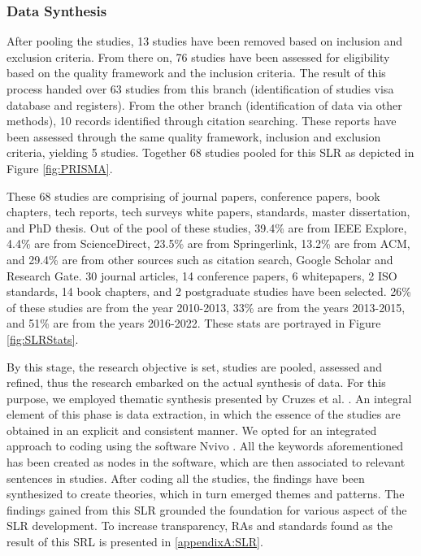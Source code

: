 \documentclass[review]{elsarticle}
\begin{document}
\subsubsection{Data Synthesis}

After pooling the studies, 13 studies have been removed based on inclusion  and exclusion criteria. From there on, 76 studies have been assessed for eligibility based on the quality framework and the inclusion criteria. The result of this process handed over 63 studies from this branch (identification of studies visa database and registers). From the other branch (identification of data via other methods), 10 records identified through citation searching. These reports have been assessed through the same quality framework, inclusion and exclusion criteria, yielding 5 studies. Together 68 studies pooled for this SLR as depicted in Figure \ref{fig:PRISMA}.


These 68 studies are comprising of journal papers, conference papers, book chapters, tech reports, tech surveys white papers, standards, master dissertation, and PhD thesis. Out of the pool of these studies, 39.4\% are from IEEE Explore, 4.4\% are from ScienceDirect, 23.5\% are from Springerlink, 13.2\% are from ACM, and 29.4\% are from other sources such as citation search, Google Scholar and Research Gate. 30 journal articles, 14 conference papers, 6 whitepapers, 2 ISO standards, 14 book chapters, and 2 postgraduate studies have been selected. 26\% of these studies are from the year 2010-2013, 33\% are from the years 2013-2015, and 51\% are from the years 2016-2022. These stats are portrayed in Figure \ref{fig:SLRStats}.


By this stage, the research objective is set, studies are pooled, assessed and refined, thus the research embarked on the actual synthesis of data. For this purpose, we employed thematic synthesis presented by Cruzes et al. \cite{cruzes2011recommended}. An integral element of this phase is data extraction, in which the essence of the studies are obtained in an explicit and consistent manner. We opted for an integrated approach to coding \cite{lofland1971analyzing} using the software Nvivo \cite{nvivo}. All the keywords aforementioned has been created as nodes in the software, which are then associated to relevant sentences in studies. After coding all the studies, the findings have been synthesized to create theories, which in turn emerged themes and patterns. The findings gained from this SLR grounded the foundation for various aspect of the SLR development. To increase transparency, RAs and standards found as the result of this SRL is presented in \ref{appendixA:SLR}. 
   
\end{document}

